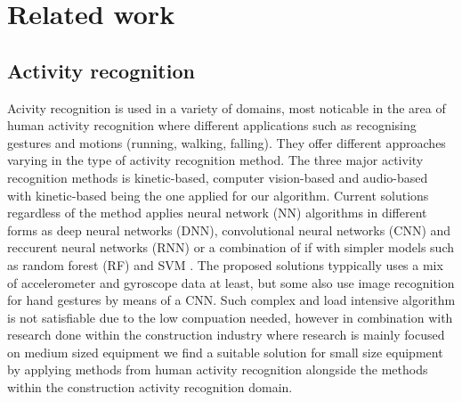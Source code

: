\section{Related work}
\subsection{Activity recognition}
Acivity recognition is used in a variety of domains, most noticable in the area of human activity recognition where different applications such as recognising gestures and motions (running, walking, falling). They offer different approaches varying in the type of activity recognition method. The three major activity recognition methods is kinetic-based, computer vision-based and audio-based  with kinetic-based being the one applied for our algorithm. Current solutions regardless of the method applies neural network (NN) algorithms in different forms as deep neural networks (DNN), convolutional neural networks (CNN) and reccurent neural networks (RNN) or a combination of if with simpler models such as random forest (RF) and SVM . The proposed solutions typpically uses a mix of accelerometer and gyroscope data at least, but some also use image recognition for hand gestures by means of a CNN. Such complex and load intensive algorithm is not satisfiable due to the low compuation needed, however in combination with research done within the construction industry  where research is mainly focused on medium sized equipment we find a suitable solution for small size equipment by applying methods from human activity recognition alongside the methods within the construction activity recognition domain.
